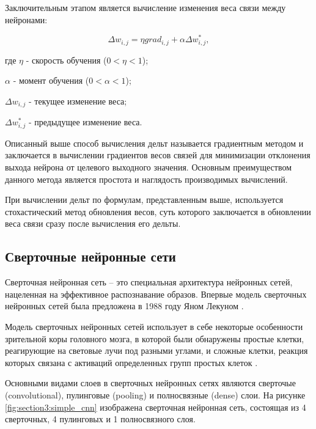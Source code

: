 Заключительным этапом является вычисление изменения веса связи между нейронами:

\begin{equation*}
    \textstyle \varDelta w_{i, j} = \eta grad_{i, j} + \alpha \varDelta w_{i, j}^{*},
\end{equation*}

\begin{explanation}
    \item[где] $\eta$ - скорость обучения ($0 < \eta < 1$);
    \item $\alpha$ - момент обучения ($0 < \alpha < 1$);
    \item $\varDelta w_{i, j}$ - текущее изменение веса;
    \item $\varDelta w_{i, j}^{*}$ - предыдущее изменение веса.
\end{explanation}

Описанный выше способ вычисления дельт называется градиентным
методом и заключается в вычислении градиентов весов связей
для минимизации отклонения выхода нейрона от целевого выходного значения.
Основным преимуществом данного метода является простота и наглядость
производимых вычислений.

При вычислении дельт по формулам, представленным выше, используется стохастический
метод обновления весов, суть которого заключается в обновлении веса связи
сразу после вычисления его дельты.

\subsection{Сверточные нейронные сети}

Сверточная нейронная сеть -- это специальная архитектура нейронных сетей,
нацеленная на эффективное распознавание образов. Впервые модель сверточных нейронных сетей была предложена в 1988 году 
Яном Лекуном \cite{lecun}.

Модель сверточных нейронных сетей использует в себе некоторые особенности
зрительной коры головного мозга, в которой были обнаружены
простые клетки, реагирующие на световые лучи под разными углами,
и сложные клетки, реакция которых связана с активаций определенных групп
простых клеток \cite{matsugu}.

Основными видами слоев в сверточных нейронных сетях являются
сверточые (convolutional), пулинговые (pooling) и полносвязные (dense) слои.
На рисунке \ref{fig:section3:simple_cnn} изображена сверточная нейронная сеть,
состоящая из 4 сверточных, 4 пулинговых и 1 полносвязного слоя.

